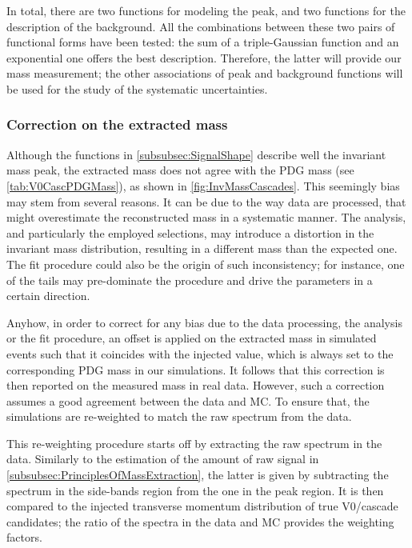 In total, there are two functions for modeling the peak, and two functions for the description of the background. All the combinations between these two pairs of functional forms have been tested: the sum of a triple-Gaussian function and an exponential one offers the best description. Therefore, the latter will provide our mass measurement; the other associations of peak and background functions will be used for the study of the systematic uncertainties.


\subsubsection{Correction on the extracted mass}
\label{subsubsec:CorrectionOnTheExtractedMass}

Although the functions in \Sec\ref{subsubsec:SignalShape} describe well the invariant mass peak, the extracted mass does not agree with the PDG mass (see \tab\ref{tab:V0CascPDGMass}), as shown in \figs\ref{fig:InvMassCascades}. This seemingly bias may stem from several reasons. It can be due to the way data are processed, that might overestimate the reconstructed mass in a systematic manner. The analysis, and particularly the employed selections, may introduce a distortion in the invariant mass distribution, resulting in a different mass than the expected one. The fit procedure could also be the origin of such inconsistency; for instance, one of the tails may pre-dominate the procedure and drive the parameters in a certain direction.

Anyhow, in order to correct for any bias due to the data processing, the analysis or the fit procedure, an offset is applied on the extracted mass in simulated events such that it coincides with the injected value, which is always set to the corresponding PDG mass in our simulations. It follows that this correction is then reported on the measured mass in real data. However, such a correction assumes a good agreement between the data and MC. To ensure that, the simulations are re-weighted to match the raw \pT spectrum from the data.

This re-weighting procedure starts off by extracting the raw \pT spectrum in the data. Similarly to the estimation of the amount of raw signal in \Sec\ref{subsubsec:PrinciplesOfMassExtraction}, the latter is given by subtracting the \pT spectrum in the side-bands region from the one in the peak region. It is then compared to the injected transverse momentum distribution of true V0/cascade candidates; the ratio of the \pT spectra in the data and MC provides the weighting factors.


